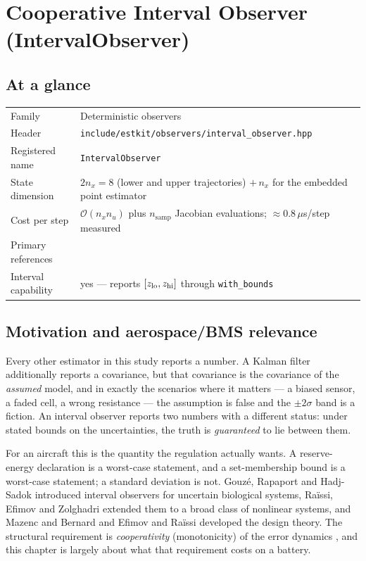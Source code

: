 \chapter{Cooperative Interval Observer (IntervalObserver)}
\label{ch:intervalobserver}

\section*{At a glance}
\begin{tabular}{@{}l>{\raggedright\arraybackslash}p{}@{}}
Family & Deterministic observers \\
Header & \texttt{include/estkit/observers/interval\_observer.hpp} \\
Registered name & \texttt{IntervalObserver} \\
State dimension & $2n_x = 8$ (lower and upper trajectories) $+\,n_x$ for the embedded point estimator \\
Cost per step & $\mathcal{O}(n_x n_u)$ plus $n_{\mathrm{samp}}$ Jacobian evaluations; $\approx 0.8\,\mu$s/step measured \\
Primary references & \cite{gouze2000interval,raissi2012interval,mazenc2011interval,efimov2016interval,smith1995monotone} \\
Interval capability & yes --- reports $[z_{\mathrm{lo}},z_{\mathrm{hi}}]$ through \texttt{with\_bounds} \\
\end{tabular}

\section{Motivation and aerospace/BMS relevance}
Every other estimator in this study reports a number.  A Kalman filter additionally reports a
covariance, but that covariance is the covariance of the \emph{assumed} model, and in exactly the
scenarios where it matters --- a biased sensor, a faded cell, a wrong resistance --- the assumption
is false and the $\pm2\sigma$ band is a fiction.  An interval observer reports two numbers with a
different status: under stated bounds on the uncertainties, the truth is \emph{guaranteed} to lie
between them.

For an aircraft this is the quantity the regulation actually wants.  A reserve-energy declaration
is a worst-case statement, and a set-membership bound is a worst-case statement; a standard
deviation is not.  Gouz\'e, Rapaport and Hadj-Sadok \cite{gouze2000interval} introduced interval
observers for uncertain biological systems, Ra\"issi, Efimov and Zolghadri
\cite{raissi2012interval} extended them to a broad class of nonlinear systems, and Mazenc and
Bernard \cite{mazenc2011interval} and Efimov and Ra\"issi \cite{efimov2016interval} developed the
design theory.  The structural requirement is \emph{cooperativity} (monotonicity) of the error
dynamics \cite{smith1995monotone}, and this chapter is largely about what that requirement costs
on a battery.

